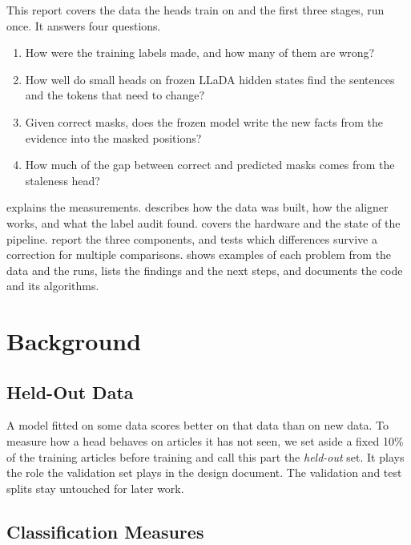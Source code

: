\documentclass[]{paper}
\begin{document}
This report covers the data the heads train on and the first three stages, run once. It answers four questions.

\begin{enumerate}
\item How were the training labels made, and how many of them are wrong?
\item How well do small heads on frozen LLaDA hidden states find the sentences and the tokens that need to change?
\item Given correct masks, does the frozen model write the new facts from the evidence into the masked positions?
\item How much of the gap between correct and predicted masks comes from the staleness head?
\end{enumerate}

 explains the measurements.  describes how the data was built, how the aligner works, and what the label audit found.  covers the hardware and the state of the pipeline.  report the three components, and  tests which differences survive a correction for multiple comparisons.  shows examples of each problem from the data and the runs,  lists the findings and the next steps, and  documents the code and its algorithms.

\section{Background}
\label{sec:background}

\subsection{Held-Out Data}

A model fitted on some data scores better on that data than on new data. To measure how a head behaves on articles it has not seen, we set aside a fixed 10\% of the training articles before training and call this part the \emph{held-out} set. It plays the role the validation set plays in the design document. The validation and test splits stay untouched for later work.

\subsection{Classification Measures}
\end{document}
